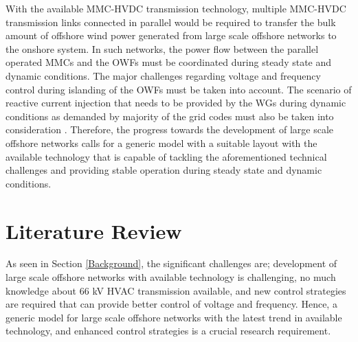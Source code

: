 With the available \gls{MMC}-\gls{HVDC} transmission technology, multiple \gls{MMC}-\gls{HVDC} transmission links connected in parallel would be required to transfer the bulk amount of offshore wind power generated from large scale offshore networks to the onshore system. In such networks, the power flow between the parallel operated \gls{MMC}s and the \gls{OWF}s must be coordinated during steady state and dynamic conditions. The major challenges regarding voltage and frequency control during islanding of the \gls{OWF}s must be taken into account. The scenario of reactive current injection that needs to be provided by the \gls{WG}s during dynamic conditions as demanded by majority of the grid codes must also be taken into consideration \cite{mohseni_review_2012}. Therefore, the progress towards the development of large scale offshore networks calls for a generic model with a suitable layout with the available technology that is capable of tackling the aforementioned technical challenges and providing stable operation during steady state and dynamic conditions. 


\section{Literature Review}\label{lit_review}

As seen in Section \ref{Background}, the significant challenges are; development of large scale offshore networks with available technology is challenging, no much knowledge about 66 kV \gls{HVAC} transmission available, and new control strategies are required that can provide better control of voltage and frequency. Hence, a generic model for large scale offshore networks with the latest trend in available technology, and enhanced control strategies is a crucial research requirement. 


